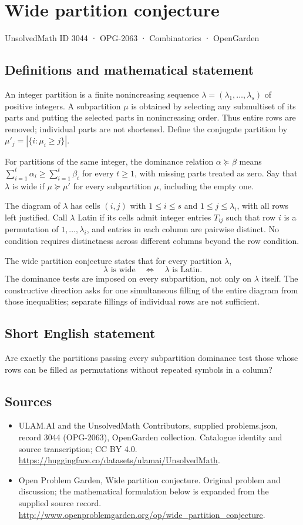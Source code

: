 \documentclass[11pt,a4paper]{article}
\begin{document}
\section*{Wide partition conjecture}\label{3044}
{\small UnsolvedMath ID 3044 · OPG-2063 · Combinatorics · OpenGarden}
\subsection{Definitions and mathematical statement}
An integer partition is a finite nonincreasing sequence
$\lambda=(\lambda_1,\ldots,\lambda_s)$ of positive integers.
A subpartition $\mu$ is obtained by selecting any submultiset of its parts
and putting the selected parts in nonincreasing order. Thus entire rows
are removed; individual parts are not shortened. Define the conjugate
partition by $\mu'_j=|\{i:\mu_i\ge j\}|$.

For partitions of the same integer, the dominance relation $\alpha\succeq\beta$
means $\sum_{i=1}^t\alpha_i\ge\sum_{i=1}^t\beta_i$ for every $t\ge1$,
with missing parts treated as zero. Say that $\lambda$ is wide if
$\mu\succeq\mu'$ for every subpartition $\mu$, including the empty one.

The diagram of $\lambda$ has cells $(i,j)$ with $1\le i\le s$ and
$1\le j\le\lambda_i$, with all rows left justified. Call $\lambda$ Latin
if its cells admit integer entries $T_{ij}$ such that row $i$ is a
permutation of $1,\ldots,\lambda_i$, and entries in each column are
pairwise distinct. No condition requires distinctness across different
columns beyond the row condition.

The wide partition conjecture states that for every partition $\lambda$,
\[
 \lambda\text{ is wide}\quad\Longleftrightarrow\quad
 \lambda\text{ is Latin}.
\]
The dominance tests are imposed on every subpartition, not only on
$\lambda$ itself. The constructive direction asks for one simultaneous
filling of the entire diagram from those inequalities; separate fillings
of individual rows are not sufficient.
\subsection{Short English statement}
Are exactly the partitions passing every subpartition dominance test those whose rows can be filled as permutations without repeated symbols in a column?
\subsection{Sources}
\begin{itemize}
\item[S1] ULAM.AI and the UnsolvedMath Contributors, supplied problems.json, record 3044 (OPG-2063), OpenGarden collection. Catalogue identity and source transcription; CC BY 4.0.
\url{https://huggingface.co/datasets/ulamai/UnsolvedMath}.
\item[S2] Open Problem Garden, Wide partition conjecture. Original problem and discussion; the mathematical formulation below is expanded from the supplied source record.
\url{http://www.openproblemgarden.org/op/wide_partition_conjecture}.
\end{itemize}
\end{document}
